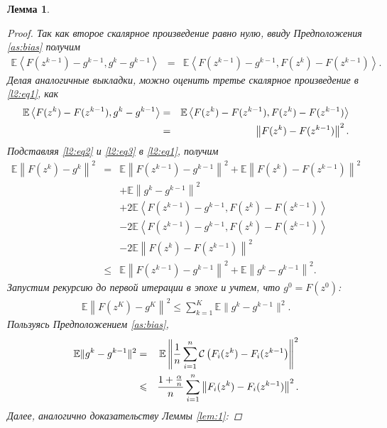 \documentclass{ProcISPRAS}
\newtheorem{lemma}{Лемма}
\begin{document}
\begin{lemma}
\begin{proof}
Так как второе скалярное произведение равно нулю, ввиду Предположения \ref{as:bias} получим
\begin{eqnarray}
\label{l2:eq2}
    \mathbb E\left\langle F(z^{k-1}) - g^{k-1}, g^k - g^{k-1}\right\rangle &=& \mathbb E\left\langle F(z^{k-1}) - g^{k-1}, F(z^k) - F(z^{k-1})\right\rangle.
    \quad~~
\end{eqnarray}
Делая аналогичные выкладки, можно оценить третье скалярное произведение в \eqref{l2:eq1}, как
\begin{eqnarray}
    \notag\mathbb E\left\langle F(z^k) - F(z^{k-1}), g^k - g^{k-1}\right\rangle &=& \mathbb E\left\langle F(z^k) - F(z^{k-1}), F(z^k) - F(z^{k-1})\right\rangle\\
    \label{l2:eq3}&=& \left\|F(z^k) - F(z^{k-1})\right\|^2.
\end{eqnarray}
Подставляя \eqref{l2:eq2} и \eqref{l2:eq3} в \eqref{l2:eq1}, получим
\begin{eqnarray*}
    \mathbb E \left\|F(z^k) - g^k\right\|^2 &=& \mathbb E \left\|F(z^{k-1}) - g^{k-1}\right\|^2 + \mathbb E \left\|F(z^k) - F(z^{k-1})\right\|^2 \\
    & & + \mathbb E \left\|g^k - g^{k-1}\right\|^2 \\
    & & + 2\mathbb E\left\langle F(z^{k-1}) - g^{k-1}, F(z^k) - F(z^{k-1})\right\rangle \\
    & & - 2\mathbb E\left\langle F(z^{k-1}) - g^{k-1}, F(z^k) - F(z^{k-1})\right\rangle \\
    & & - 2\mathbb E\left\|F(z^k) - F(z^{k-1})\right\|^2\\
    &\leqslant& \mathbb E \left\|F(z^{k-1}) - g^{k-1}\right\|^2 + \mathbb E \left\|g^k - g^{k-1}\right\|^2.
\end{eqnarray*}
Запустим рекурсию до первой итерации в эпохе и учтем, что $g^0 = F(z^0)$:
\begin{eqnarray}
\label{l2:eq4}
    \mathbb E\left\|F(z^K) - g^{K} \right\|^2 \leqslant \sum\limits_{k=1}^K\mathbb E\|g^k - g^{k-1}\|^2.
\end{eqnarray}
Пользуясь Предположением \ref{as:bias},
\begin{eqnarray}
    \notag\mathbb E\|g^k - g^{k-1}\|^2 &=& \mathbb E\left\|\frac{1}{n}\sum\limits_{i=1}^n\mathcal{C}\left(F_i(z^k) - F_i(z^{k-1}\right)\right\|^2\\
    \label{l2:eq5}&\leqslant& \frac{1+\frac{\alpha}{n}}{n}\sum\limits_{i=1}^n\left\|F_i(z^k) - F_i(z^{k-1})\right\|^2.
\end{eqnarray}
Далее, аналогично доказательству Леммы \ref{lem:1}:

\end{proof}
\end{lemma}
\end{document}
